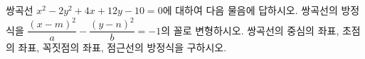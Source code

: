 쌍곡선 $x^2-2y^2+4x+12y-10=0$에 대하여 다음 물음에 답하시오.
 쌍곡선의 방정식을 $\dfrac{(x-m)^2}{a}-\dfrac{(y-n)^2}{b}=-1$의 꼴로 변형하시오.
 쌍곡선의 중심의 좌표, 초점의 좌표, 꼭짓점의 좌표, 점근선의 방정식을 구하시오.
